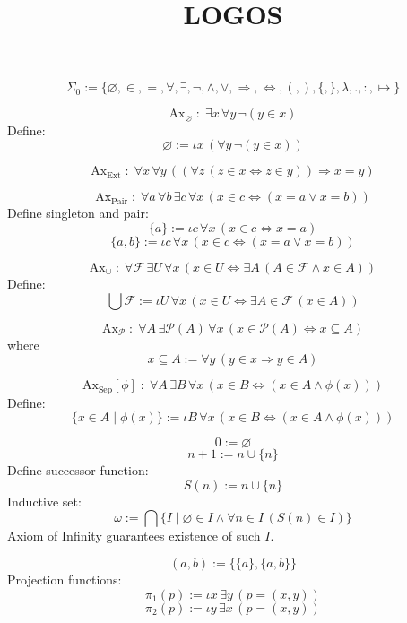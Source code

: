 \documentclass{article}
\begin{document}
\title{LOGOS}
\author{}
\date{}
\maketitle

\[
\Sigma_0 := \{ \varnothing, \in, =, \forall, \exists, \neg, \land, \lor, \Rightarrow, \Leftrightarrow, (, ), \{, \}, \lambda, ., :, \mapsto \}
\]

\[
\text{Ax}_\varnothing \;:\; \exists x \, \forall y \, \neg(y \in x)
\]
Define:
\[
\varnothing := \iota x \, (\forall y \, \neg(y \in x))
\]

\[
\text{Ax}_{\text{Ext}} \;:\; \forall x \, \forall y \, \left( (\forall z \, (z \in x \Leftrightarrow z \in y)) \Rightarrow x = y \right)
\]

\[
\text{Ax}_{\text{Pair}} \;:\; \forall a \, \forall b \, \exists c \, \forall x \, (x \in c \Leftrightarrow (x = a \lor x = b))
\]
Define singleton and pair:
\[
\{a\} := \iota c \, \forall x \, (x \in c \Leftrightarrow x = a)
\]
\[
\{a, b\} := \iota c \, \forall x \, (x \in c \Leftrightarrow (x = a \lor x = b))
\]

\[
\text{Ax}_{\cup} \;:\; \forall \mathcal{F} \, \exists U \, \forall x \, (x \in U \Leftrightarrow \exists A \, (A \in \mathcal{F} \land x \in A))
\]
Define:
\[
\bigcup \mathcal{F} := \iota U \, \forall x \, (x \in U \Leftrightarrow \exists A \in \mathcal{F} \, (x \in A))
\]

\[
\text{Ax}_{\mathcal{P}} \;:\; \forall A \, \exists \mathcal{P}(A) \, \forall x \, (x \in \mathcal{P}(A) \Leftrightarrow x \subseteq A)
\]
where
\[
x \subseteq A := \forall y \, (y \in x \Rightarrow y \in A)
\]

\[
\text{Ax}_{\text{Sep}}[\phi] \;:\; \forall A \, \exists B \, \forall x \, (x \in B \Leftrightarrow (x \in A \land \phi(x)))
\]
Define:
\[
\{ x \in A \mid \phi(x) \} := \iota B \, \forall x \, (x \in B \Leftrightarrow (x \in A \land \phi(x)))
\]

\[
0 := \varnothing
\]
\[
n + 1 := n \cup \{n\}
\]
Define successor function:
\[
S(n) := n \cup \{n\}
\]
Inductive set:
\[
\omega := \bigcap \{ I \mid \varnothing \in I \land \forall n \in I \, (S(n) \in I) \}
\]
Axiom of Infinity guarantees existence of such $I$.

\[
(a, b) := \{ \{a\}, \{a, b\} \}
\]
Projection functions:
\[
\pi_1(p) := \iota x \, \exists y \, (p = (x, y))
\]
\[
\pi_2(p) := \iota y \, \exists x \, (p = (x, y))
\]
\end{document}
